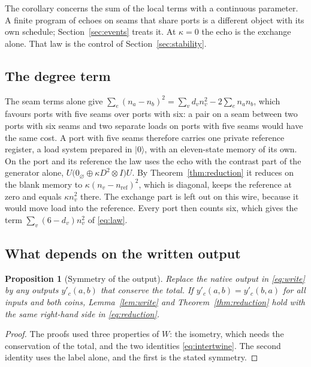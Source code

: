 \documentclass[11pt]{article}
\newtheorem{proposition}[theorem]{Proposition}
\theoremstyle{definition}
\theoremstyle{remark}
\theoremstyle{plain}
\newcommand{\ket}[1]{\lvert #1\rangle}
\newcommand{\blank}{\varnothing}
\begin{document}
The corollary concerns the sum of the local terms with a continuous
parameter. A finite program of echoes on seams that share ports is a
different object with its own schedule; Section~\ref{sec:events} treats it.
At $\kappa=0$ the echo is the exchange alone. That law is the control of
Section~\ref{sec:stability}.

\subsection{The degree term}

The seam terms alone give $\sum_e(n_a-n_b)^2=\sum_vd_vn_v^2-2\sum_en_an_b$,
which favours ports with five seams over ports with six: a pair on a seam
between two ports with six seams and two separate loads on ports with five
seams would have the same cost. A port with five seams therefore carries
one private reference register, a load system prepared in $\ket{0}$, with
an eleven-state memory of its own. On the port and its reference the law
uses the echo with the contrast part of the generator alone,
$U\bigl(0_{\blank}\oplus\kappa D^{2}\otimes I\bigr)U$. By
Theorem~\ref{thm:reduction} it reduces on the blank memory to
$\kappa(n_v-n_{\mathrm{ref}})^{2}$, which is diagonal, keeps the reference
at zero and equals $\kappa n_v^{2}$ there. The exchange part is left out on
this wire, because it would move load into the reference. Every port then
counts six, which gives the term $\sum_v(6-d_v)n_v^{2}$ of \eqref{eq:law}.

\subsection{What depends on the written output}

\begin{proposition}[Symmetry of the output]
\label{prop:symmetry}
Replace the native output in \eqref{eq:write} by any outputs $y'_c(a,b)$
that conserve the total. If $y'_c(a,b)=y'_c(b,a)$ for all inputs and both
coins, Lemma~\ref{lem:write} and Theorem~\ref{thm:reduction} hold with the
same right-hand side in \eqref{eq:reduction}.
\end{proposition}

\begin{proof}
The proofs used three properties of $W$: the isometry, which needs the
conservation of the total, and the two identities \eqref{eq:intertwine}.
The second identity uses the label alone, and the first is the stated
symmetry.
\end{proof}
\end{document}
